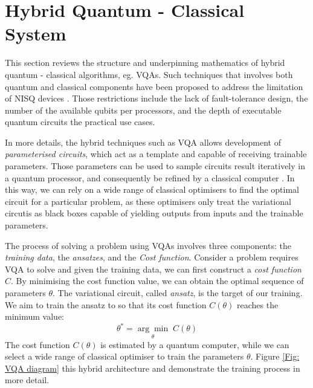 \section{Hybrid Quantum - Classical System} \label{Sec: Hybrid Quantum - Classical System}

This section reviews the structure and underpinning mathematics of hybrid quantum - classical algorithms, eg. VQAs.
Such techniques that involves both quantum and classical components have been proposed to address the limitation of NISQ devices \cite{brooksQuantumSupremacyHunt2019}.
Those restrictions include the lack of fault-tolerance design, the number of the available qubits per processors, and the depth of executable quantum circuits the practical use cases.

In more details, the hybrid techniques such as VQA allows development of \emph{parameterised circuits}, which act as a template and capable of receiving trainable parameters.
Those parameters can be used to sample circuits result iteratively in a quantum processor, and consequently be refined by a classical computer \cite{cerezo_variational_2021}.
In this way, we can rely on a wide range of classical optimisers to find the optimal circuit for a particular problem, as these optimisers only treat the variational circutis as black boxes capable of yielding outputs from inputs and the trainable parameters.



The process of solving a problem using VQAs involves three components: the \textit{training data}, the \textit{ansatzes}, and the \textit{Cost function}.
Consider a problem requires VQA to solve and given the training data, we can first construct a \textit{cost function} $C$.
By minimising the cost function value, we can obtain the optimal sequence of parameters $\theta$.
The variational circuit, called \textit{ansatz}, is the target of our training.
We aim to train the ansatz to so that its cost function $C(\theta)$ reaches the minimum value:
\begin{equation}
    \theta^* = \underset{\theta}{\arg \min} \;C(\theta)
    \label{Eqn: optimize theta with ansatz}
\end{equation}
The cost function $C(\theta)$ is estimated by a quantum computer, while we can select a wide range of classical optimiser to train the parameters $\theta$.
Figure \ref{Fig: VQA diagram} this hybrid architecture and demonstrate the training process in more detail.


